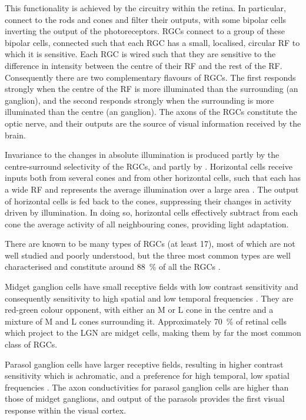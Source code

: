 This functionality is achieved by the circuitry within the retina.
In particular,  connect to the rods and cones and filter their outputs, with some bipolar cells inverting the output of the photoreceptors.
\acp{RGC} connect to a group of these bipolar cells, connected such that each \ac{RGC} has a small, localised, circular \ac{RF} to which it is sensitive.
Each \ac{RGC} is wired such that they are sensitive to the difference in intensity between the centre of their \ac{RF} and the rest of the \ac{RF}.
Consequently there are two complementary flavours of \acp{RGC}.
The first responds strongly when the centre of the \ac{RF} is more illuminated than the surrounding (an  ganglion), and the second responds strongly when the surrounding is more illuminated than the centre (an  ganglion).
The axons of the \acp{RGC} constitute the optic nerve, and their outputs are the source of visual information received by the brain.

Invariance to the changes in absolute illumination is produced partly by the centre-surround selectivity of the \acp{RGC}, and partly by .
Horizontal cells receive inputs both from several cones and from other horizontal cells, such that each has a wide \ac{RF} and represents the average illumination over a large area \citep[Chapter~11]{nsbook}.
The output of horizontal cells is fed back to the cones, suppressing their changes in activity driven by illumination.
In doing so, horizontal cells effectively subtract from each cone the average activity of all neighbouring cones, providing light adaptation.

There are known to be many types of \acp{RGC} (at least \num{17}), most of which are not well studied and poorly understood, but the three most common types are well characterised and constitute around \SI{88}{\percent} of all the \acp{RGC} \citep{Nassi2009}.

Midget ganglion cells have small receptive fields with low contrast sensitivity and consequently sensitivity to high spatial and low temporal frequencies \citep{Nassi2009}.
They are red-green colour opponent, with either an \ac{M} or \ac{L} cone in the centre and a mixture of \ac{M} and \ac{L} cones surrounding it.
Approximately \SI{70}{\percent} of retinal cells which project to the \ac{LGN} are midget cells, making them by far the most common class of \acp{RGC}.

Parasol ganglion cells have larger receptive fields, resulting in higher contrast sensitivity which is achromatic, and a preference for high temporal, low spatial frequencies \citep{Nassi2009}.
The axon conductivities for parasol ganglion cells are higher than those of midget ganglions, and output of the parasols provides the first visual response within the visual cortex.

